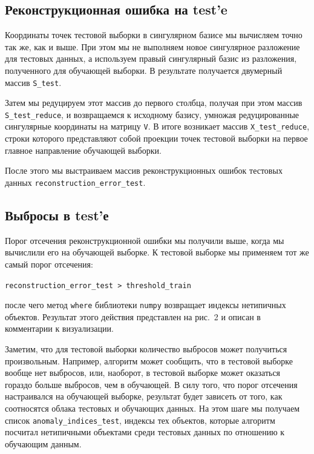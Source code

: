 \documentclass[a4paper,12pt]{article}
\begin{document}
\subsection{Реконструкционная ошибка на test'e}

Координаты точек тестовой выборки в сингулярном базисе мы вычисляем точно так же, как и выше. При этом мы не выполняем новое сингулярное разложение для тестовых данных, а используем правый сингулярный базис из разложения, полученного для обучающей выборки. В результате получается двумерный массив \texttt{S\_test}.

Затем мы редуцируем этот массив до первого столбца, получая при этом массив \texttt{S\_test\_reduce}, и возвращаемся к исходному базису, умножая редуцированные сингулярные координаты на матрицу \texttt{V}. В итоге возникает массив \texttt{X\_test\_reduce}, строки которого представляют собой проекции точек тестовой выборки на первое главное направление обучающей выборки.

После этого мы выстраиваем массив реконструкционных ошибок тестовых данных \texttt{reconstruction\_error\_test}.


\subsection{Выбросы в test'е}

Порог отсечения реконструкционной ошибки мы получили выше, когда мы вычислили его на обучающей выборке. К тестовой выборке мы применяем тот же самый порог отсечения:

\medskip
\noindent
\texttt{reconstruction\_error\_test > threshold\_train}

\medskip
\noindent
после чего метод \texttt{where} библиотеки \texttt{numpy} возвращает индексы нетипичных объектов. Результат этого действия представлен на рис. 2 и описан в комментарии к визуализации.

Заметим, что для тестовой выборки количество выбросов может получиться произвольным. Например, алгоритм может сообщить, что в тестовой выборке вообще нет выбросов, или, наоборот, в тестовой выборке может оказаться гораздо больше выбросов, чем в обучающей. В силу того, что порог отсечения настраивался на обучающей выборке, результат будет зависеть от того, как соотносятся облака тестовых и обучающих данных. На этом шаге мы получаем список \texttt{anomaly\_indices\_test}, индексы тех объектов, которые алгоритм посчитал нетипичными объектами среди тестовых данных по отношению к обучающим данным.
\end{document}
